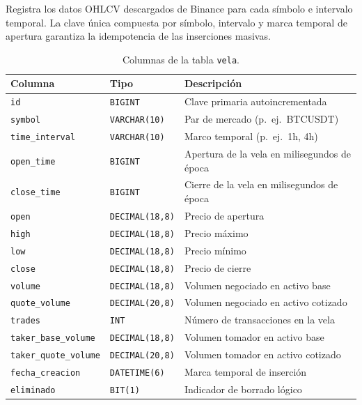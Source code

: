 Registra los datos OHLCV descargados de Binance para cada símbolo e intervalo temporal. La clave única compuesta por símbolo, intervalo y marca temporal de apertura garantiza la idempotencia de las inserciones masivas.

\begin{table}[h]
\centering
\caption{Columnas de la tabla \texttt{vela}.}
\label{tab:sql-vela}
\begin{tabular}{@{}llp{6cm}@{}}
\toprule
\textbf{Columna} & \textbf{Tipo} & \textbf{Descripción} \\
\midrule
\texttt{id}                  & \texttt{BIGINT}        & Clave primaria autoincrementada \\
\texttt{symbol}              & \texttt{VARCHAR(10)}   & Par de mercado (p.\ ej.\ BTCUSDT) \\
\texttt{time\_interval}      & \texttt{VARCHAR(10)}   & Marco temporal (p.\ ej.\ 1h, 4h) \\
\texttt{open\_time}          & \texttt{BIGINT}        & Apertura de la vela en milisegundos de época \\
\texttt{close\_time}         & \texttt{BIGINT}        & Cierre de la vela en milisegundos de época \\
\texttt{open}                & \texttt{DECIMAL(18,8)} & Precio de apertura \\
\texttt{high}                & \texttt{DECIMAL(18,8)} & Precio máximo \\
\texttt{low}                 & \texttt{DECIMAL(18,8)} & Precio mínimo \\
\texttt{close}               & \texttt{DECIMAL(18,8)} & Precio de cierre \\
\texttt{volume}              & \texttt{DECIMAL(18,8)} & Volumen negociado en activo base \\
\texttt{quote\_volume}       & \texttt{DECIMAL(20,8)} & Volumen negociado en activo cotizado \\
\texttt{trades}              & \texttt{INT}           & Número de transacciones en la vela \\
\texttt{taker\_base\_volume}  & \texttt{DECIMAL(18,8)} & Volumen tomador en activo base \\
\texttt{taker\_quote\_volume} & \texttt{DECIMAL(20,8)} & Volumen tomador en activo cotizado \\
\texttt{fecha\_creacion}     & \texttt{DATETIME(6)}   & Marca temporal de inserción \\
\texttt{eliminado}           & \texttt{BIT(1)}        & Indicador de borrado lógico \\
\bottomrule
\end{tabular}
\end{table}

